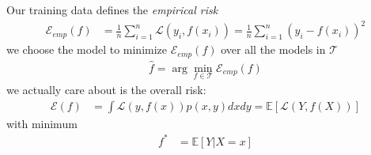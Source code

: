Our training data defines the \textit{empirical risk}
\begin{align*}
    \mathcal{E}_{emp}(f) &=\frac{1}{n}\sum_{i=1}^{n}\mathcal{L}(y_i,f(x_i))=\frac{1}{n}\sum_{i=1}^{n}\left(y_i - f(x_i)\right)^2
\end{align*}
we choose the model to minimize $\mathcal{E}_{emp}(f)$ over all the models in $\mathcal{T}$
\begin{align*}
    \hat{f} = \arg\min_{f\in\mathcal{T}} \mathcal{E}_{emp}(f)
\end{align*}
\pause{}
 we actually care about is the overall risk:
\begin{align*}
    \mathcal{E}(f)&=\int\mathcal{L}(y,f(x))p(x,y)dxdy = \mathbb{E}\left[\mathcal{L}(Y,f(X))\right]
\end{align*}
\pause{}
with minimum
\begin{align*}
    f^{*}&= \mathbb{E}\left[Y\vert X=x\right]
\end{align*}
